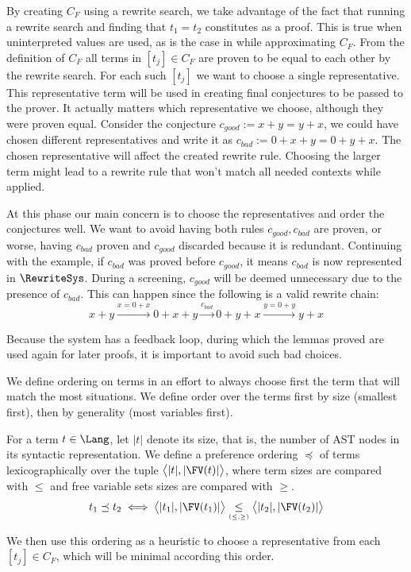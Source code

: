 \newcommand\tgood{\textit{good}}
\newcommand\tbad{\textit{bad}}

By creating $C_F$ using a rewrite search, we take advantage of the fact that running a rewrite search and finding that $t_1 = t_2$ constitutes as a proof.
This is true when uninterpreted values are used, as is the case in while approximating $C_F$.
From the definition of $C_F$ all terms in $\left[ t_j \right] \in C_F$ are proven to be equal to each other by the rewrite search.
For each such $\left[ t_j \right]$ we want to choose a single representative.
This representative term will be used in creating final conjectures to be passed to the prover.
It actually matters which representative we choose, although they were proven equal.
Consider the conjecture $c_{\tgood} := x + y = y + x$, we could have chosen different representatives and write it as $c_{\tbad} := 0 + x + y = 0 + y + x$.
The chosen representative will affect the created rewrite rule.
Choosing the larger term might lead to a rewrite rule that won't match all needed contexts while applied.

At this phase our main concern is to choose the representatives and order the conjectures well. 
We want to avoid having both rules $c_{\tgood}, c_{\tbad}$ are proven, or worse, having $c_{\tbad}$ proven and $c_{\tgood}$ discarded because it is redundant.
Continuing with the example, if $c_{\tbad}$ was proved before $c_{\tgood}$, it means $c_{\tbad}$ is now represented in $\RewriteSys$.
During a screening, $c_{\tgood}$ will be deemed unnecessary due to the presence of $c_{\tbad}$.
This can happen since the following is a valid rewrite chain:
\[x + y \xrightarrow{x = 0 + x} 0 + x + y \xrightarrow{c_{\tbad}} 0 + y + x \xrightarrow{y = 0 + y} y + x\] 

Because the system has a feedback loop, during which the lemmas proved are used again for later proofs, it is important to avoid such bad choices.

We define ordering on terms in an effort to always choose first the term that will match the most situations. 
We define order over the terms first by size (smallest first), then by generality (most variables first).
\begin{definition}
\label{induction:ordering}
For a term $t\in\Lang$, let $|t|$ denote its size, that is, the number of
AST nodes in its syntactic representation.
We define a preference ordering $\preceq$ of terms lexicographically over
the tuple $\big\langle|t|, |\FV(t)|\big\rangle$, where term sizes are compared with $\leq$
and free variable sets sizes are compared with $\geq$.
\[t_1 \preceq t_2 \iff \big\langle|t_1|, |\FV(t_1)|\big\rangle
    \underset{\scriptscriptstyle (\leq,\geq)}{\leq}
    \big\langle|t_2|, |\FV(t_2)|\big\rangle\]
\end{definition}
We then use this ordering as a heuristic to choose a representative from each $\left[ t_j \right] \in C_F$, which will be minimal according this order.

